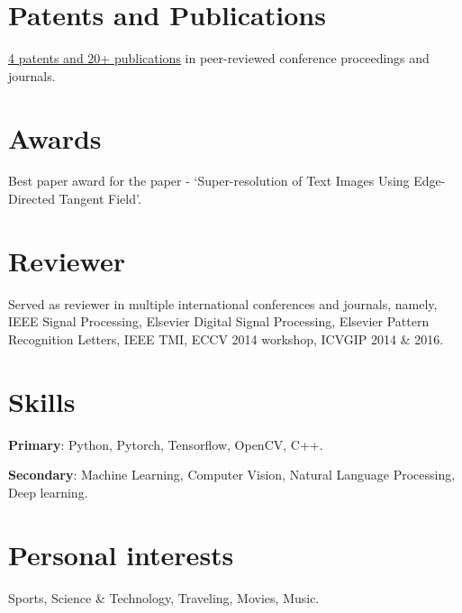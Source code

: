 \documentclass[a4paper,online]{adcv}
\begin{document}
\begin{adcvtabletwo}
  

\end{adcvtabletwo}

\section{Patents and Publications}

\href{https://scholar.google.co.in/citations?user=SaF-0PcAAAAJ&hl=en}{4 patents and 20+ publications} in peer-reviewed conference proceedings and journals.

\section{Awards}

Best paper award for the paper - `Super-resolution of Text Images Using Edge-Directed Tangent Field'.

\section{Reviewer}

Served as reviewer in multiple international conferences and journals, namely, IEEE Signal Processing, Elsevier Digital Signal Processing, Elsevier Pattern Recognition Letters, IEEE TMI, ECCV 2014 workshop, ICVGIP 2014 \& 2016.

\section{Skills}

\textbf{Primary}: Python, Pytorch, Tensorflow, OpenCV, C++.

\textbf{Secondary}: Machine Learning, Computer Vision, Natural Language Processing, Deep learning.


\section{Personal interests}

Sports, Science \& Technology, Traveling, Movies, Music.
\end{document}
